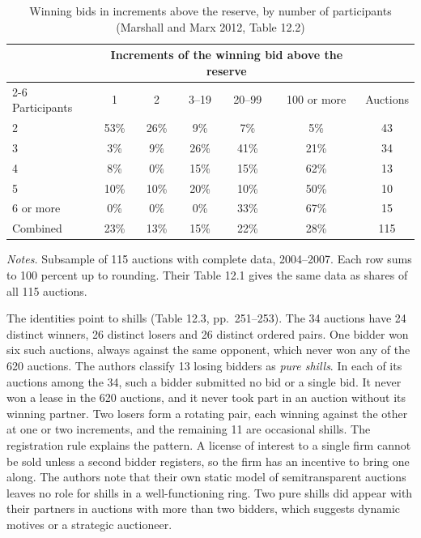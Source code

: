 \begin{table}[htbp]
\centering
\caption{Winning bids in increments above the reserve, by number of participants (Marshall and Marx 2012,
Table 12.2)}
\label{tab:15-mm-russia}
\begin{tabular}{lcccccc}
\toprule
 & \multicolumn{5}{c}{Increments of the winning bid above the reserve} & \\
\cmidrule(lr){2-6}
Participants & 1 & 2 & 3--19 & 20--99 & 100 or more & Auctions\\
\midrule
2 & 53\% & 26\% & 9\% & 7\% & 5\% & 43\\
3 & 3\% & 9\% & 26\% & 41\% & 21\% & 34\\
4 & 8\% & 0\% & 15\% & 15\% & 62\% & 13\\
5 & 10\% & 10\% & 20\% & 10\% & 50\% & 10\\
6 or more & 0\% & 0\% & 0\% & 33\% & 67\% & 15\\
\addlinespace
Combined & 23\% & 13\% & 15\% & 22\% & 28\% & 115\\
\bottomrule
\end{tabular}

\smallskip
\begin{minipage}{0.93\textwidth}
\footnotesize \textit{Notes.} Subsample of 115 auctions with complete data, 2004--2007. Each row sums to 100
percent up to rounding. Their Table 12.1 gives the same data as shares of all 115 auctions.
\end{minipage}
\end{table}

The identities point to shills (Table 12.3, pp.~251--253). The 34 auctions have 24 distinct winners, 26
distinct losers and 26 distinct ordered pairs. One bidder won six such auctions, always against the same
opponent, which never won any of the 620 auctions. The authors classify 13 losing bidders as \emph{pure
shills}. In each of its auctions among the 34, such a bidder submitted no bid or a single bid. It never won a
lease in the 620 auctions, and it never took part in an auction without its winning partner. Two losers
form a rotating pair, each winning against the other at one or two
increments, and the remaining 11 are occasional shills. The registration rule explains the pattern. A
license of interest to a single firm cannot be sold unless a second bidder registers, so the firm has an
incentive to bring one along. The authors note that their own static model of semitransparent auctions
leaves no role for shills in a well-functioning ring. Two pure shills did appear with their partners in
auctions with more than two bidders, which suggests dynamic motives or a strategic auctioneer.

